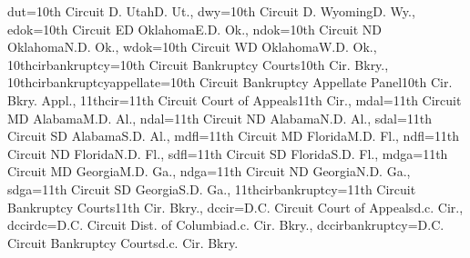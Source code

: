 {dut={{10th Circuit D. Utah}{D. Ut.}},
dwy={{10th Circuit D. Wyoming}{D. Wy.}},
edok={{10th Circuit ED Oklahoma}{E.D. Ok.}},
ndok={{10th Circuit ND Oklahoma}{N.D. Ok.}},
wdok={{10th Circuit WD Oklahoma}{W.D. Ok.}},
10thcirbankruptcy={{10th Circuit Bankruptcy Courts}{10th Cir. Bkry.}},
10thcirbankruptcyappellate={{10th Circuit Bankruptcy Appellate Panel}{10th Cir. Bkry. Appl.}},
11thcir={{11th Circuit Court of Appeals}{11th Cir.}},
mdal={{11th Circuit MD Alabama}{M.D. Al.}},
ndal={{11th Circuit ND Alabama}{N.D. Al.}},
sdal={{11th Circuit SD Alabama}{S.D. Al.}},
mdfl={{11th Circuit MD Florida}{M.D. Fl.}},
ndfl={{11th Circuit ND Florida}{N.D. Fl.}},
sdfl={{11th Circuit SD Florida}{S.D. Fl.}},
mdga={{11th Circuit MD Georgia}{M.D. Ga.}},
ndga={{11th Circuit ND Georgia}{N.D. Ga.}},
sdga={{11th Circuit SD Georgia}{S.D. Ga.}},
11thcirbankruptcy={{11th Circuit Bankruptcy Courts}{11th Cir. Bkry.}},
dccir={{D.C. Circuit Court of Appeals}{d.c. Cir.}},
dccirdc={{D.C. Circuit Dist. of Columbia}{d.c. Cir. Bkry.}},
dccirbankruptcy={{D.C. Circuit Bankruptcy Courts}{d.c. Cir. Bkry.}}
}
